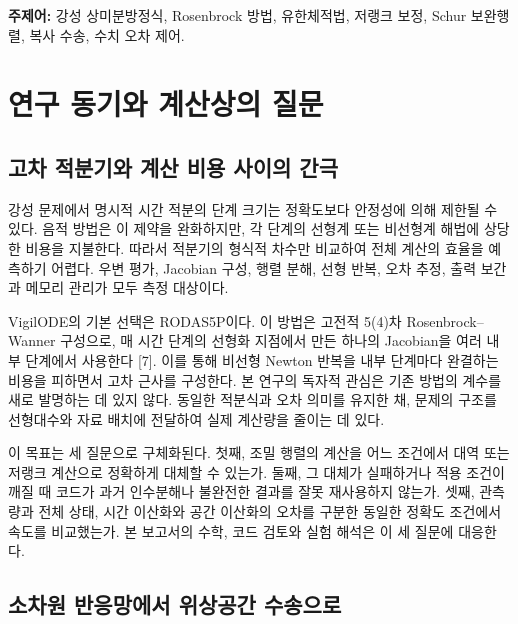 \documentclass[
  10pt,
  a4paper,
]{article}
\begin{document}
\textbf{주제어:} 강성 상미분방정식, Rosenbrock 방법, 유한체적법, 저랭크
보정, Schur 보완행렬, 복사 수송, 수치 오차 제어.

\hypertarget{uxc5f0uxad6c-uxb3d9uxae30uxc640-uxacc4uxc0b0uxc0c1uxc758-uxc9c8uxbb38}{%
\section{연구 동기와 계산상의
질문}\label{uxc5f0uxad6c-uxb3d9uxae30uxc640-uxacc4uxc0b0uxc0c1uxc758-uxc9c8uxbb38}}

\hypertarget{uxace0uxcc28-uxc801uxbd84uxae30uxc640-uxacc4uxc0b0-uxbe44uxc6a9-uxc0acuxc774uxc758-uxac04uxadf9}{%
\subsection{고차 적분기와 계산 비용 사이의
간극}\label{uxace0uxcc28-uxc801uxbd84uxae30uxc640-uxacc4uxc0b0-uxbe44uxc6a9-uxc0acuxc774uxc758-uxac04uxadf9}}

강성 문제에서 명시적 시간 적분의 단계 크기는 정확도보다 안정성에 의해
제한될 수 있다. 음적 방법은 이 제약을 완화하지만, 각 단계의 선형계 또는
비선형계 해법에 상당한 비용을 지불한다. 따라서 적분기의 형식적 차수만
비교하여 전체 계산의 효율을 예측하기 어렵다. 우변 평가, Jacobian 구성,
행렬 분해, 선형 반복, 오차 추정, 출력 보간과 메모리 관리가 모두 측정
대상이다.

VigilODE의 기본 선택은 RODAS5P이다. 이 방법은 고전적 5(4)차
Rosenbrock--Wanner 구성으로, 매 시간 단계의 선형화 지점에서 만든 하나의
Jacobian을 여러 내부 단계에서 사용한다 {[}7{]}. 이를 통해 비선형 Newton
반복을 내부 단계마다 완결하는 비용을 피하면서 고차 근사를 구성한다. 본
연구의 독자적 관심은 기존 방법의 계수를 새로 발명하는 데 있지 않다.
동일한 적분식과 오차 의미를 유지한 채, 문제의 구조를 선형대수와 자료
배치에 전달하여 실제 계산량을 줄이는 데 있다.

이 목표는 세 질문으로 구체화된다. 첫째, 조밀 행렬의 계산을 어느 조건에서
대역 또는 저랭크 계산으로 정확하게 대체할 수 있는가. 둘째, 그 대체가
실패하거나 적용 조건이 깨질 때 코드가 과거 인수분해나 불완전한 결과를
잘못 재사용하지 않는가. 셋째, 관측량과 전체 상태, 시간 이산화와 공간
이산화의 오차를 구분한 동일한 정확도 조건에서 속도를 비교했는가. 본
보고서의 수학, 코드 검토와 실험 해석은 이 세 질문에 대응한다.

\hypertarget{uxc18cuxcc28uxc6d0-uxbc18uxc751uxb9dduxc5d0uxc11c-uxc704uxc0c1uxacf5uxac04-uxc218uxc1a1uxc73cuxb85c}{%
\subsection{소차원 반응망에서 위상공간
수송으로}\label{uxc18cuxcc28uxc6d0-uxbc18uxc751uxb9dduxc5d0uxc11c-uxc704uxc0c1uxacf5uxac04-uxc218uxc1a1uxc73cuxb85c}}
\end{document}

